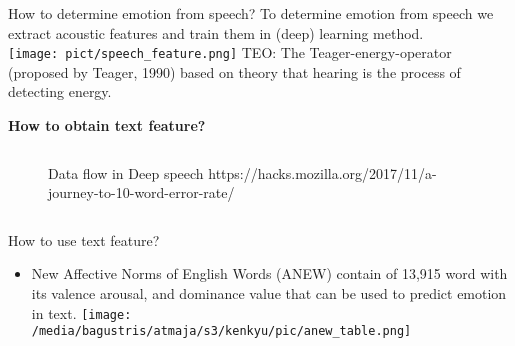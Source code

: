 \documentclass{beamer}
\begin{document}
\begin{frame}[t, fragile]{How to determine emotion from speech?}
To determine emotion from speech we extract acoustic features and train them in (deep) 
learning method.\\
\texttt{[image: pict/speech\_feature.png]}
\newline
TEO: The Teager-energy-operator (proposed by Teager, 1990) based on theory that 
hearing is the process of detecting energy.
\end{frame}

\begin{frame}[t, fragile]
\textbf{How to obtain text feature?}
\begin{columns}
	\begin{figure} 
	\caption{\small {Data flow in Deep speech}  
	\tiny{https://hacks.mozilla.org/2017/11/a-journey-to-10-word-error-rate/}}
	\end{figure} 
\end{columns}
\end{frame}

\begin{frame}[t, fragile]{How to use text feature?}
\begin{itemize}
\item New Affective Norms of English Words (ANEW\footnotemark) contain of 13,915 word with its valence
      arousal, and dominance value that can be used to predict emotion in text.
\texttt{[image: /media/bagustris/atmaja/s3/kenkyu/pic/anew\_table.png]}
\end{itemize}
\end{frame}
\end{document}
